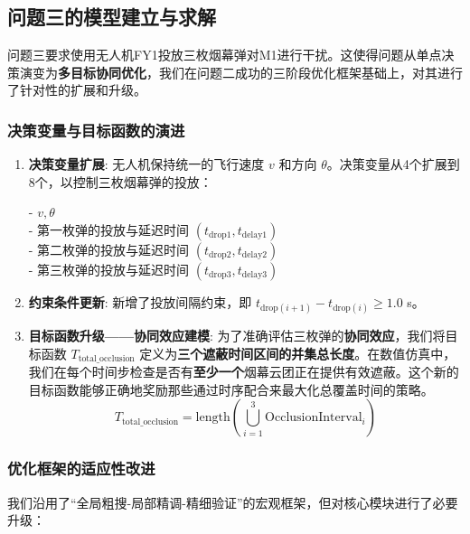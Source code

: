 \documentclass[12pt]{article}
\begin{document}
\begin{CJK}{UTF8}{gbsn}
	\subsection{问题三的模型建立与求解}
	
	
	问题三要求使用无人机FY1投放三枚烟幕弹对M1进行干扰。这使得问题从单点决策演变为\textbf{多目标协同优化}，我们在问题二成功的三阶段优化框架基础上，对其进行了针对性的扩展和升级。
	
	\subsubsection{决策变量与目标函数的演进}

	\begin{enumerate}
		\item \textbf{决策变量扩展}: 无人机保持统一的飞行速度 $v$ 和方向 $\theta$。决策变量从4个扩展到8个，以控制三枚烟幕弹的投放：
		
		 - $v, \theta$\\
		\indent - 第一枚弹的投放与延迟时间 $(t_{\text{drop1}}, t_{\text{delay1}})$\\
		\indent - 第二枚弹的投放与延迟时间 $(t_{\text{drop2}}, t_{\text{delay2}})$\\
		\indent - 第三枚弹的投放与延迟时间 $(t_{\text{drop3}}, t_{\text{delay3}})$
	
		\item \textbf{约束条件更新}: 新增了投放间隔约束，即 $t_{\text{drop}(i+1)} - t_{\text{drop}(i)} \ge 1.0$ s。
		
		\item \textbf{目标函数升级——协同效应建模}:
		为了准确评估三枚弹的\textbf{协同效应}，我们将目标函数 $T_{\text{total\_occlusion}}$ 定义为\textbf{三个遮蔽时间区间的并集总长度}。在数值仿真中，我们在每个时间步检查是否有\textbf{至少一个}烟幕云团正在提供有效遮蔽。这个新的目标函数能够正确地奖励那些通过时序配合来最大化总覆盖时间的策略。
		\begin{equation}
			T_{\text{total\_occlusion}} = \text{length} \left( \bigcup_{i=1}^{3} \text{OcclusionInterval}_i \right)
		\end{equation}
		
	\end{enumerate}
	
	\subsubsection{优化框架的适应性改进}
	我们沿用了“全局粗搜-局部精调-精细验证”的宏观框架，但对核心模块进行了必要升级：
	

\end{CJK}
\end{document}
